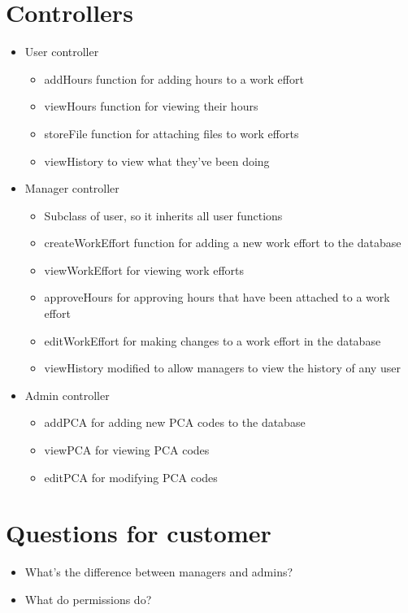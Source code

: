 \documentclass{article}
\begin{document}
\section{Controllers}
\begin{itemize}
\item User controller
	\begin{itemize}
	\item addHours function for adding hours to a work effort
	\item viewHours function for viewing their hours
	\item storeFile function for attaching files to work efforts
	\item viewHistory to view what they've been doing
	\end{itemize}
\item Manager controller
	\begin{itemize}
	\item Subclass of user, so it inherits all user functions
	\item createWorkEffort function for adding a new work effort to the database
	\item viewWorkEffort for viewing work efforts
	\item approveHours for approving hours that have been attached to a work effort
	\item editWorkEffort for making changes to a work effort in the database
	\item viewHistory modified to allow managers to view the history of any user
	\end{itemize}
\item Admin controller
	\begin{itemize}
	\item addPCA for adding new PCA codes to the database
	\item viewPCA for viewing PCA codes
	\item editPCA for modifying PCA codes
	\end{itemize}
\end{itemize}

\section{Questions for customer}
\begin{itemize}
\item What's the difference between managers and admins?
\item What do permissions do?
\end{itemize}
\end{document}
